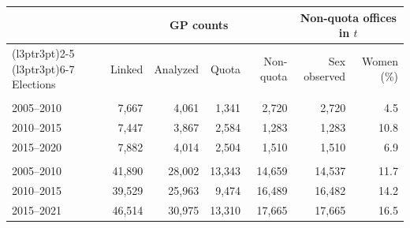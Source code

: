 
\begin{tabular}[t]{lrrrrrr}
\toprule
\multicolumn{1}{c}{ } & \multicolumn{4}{c}{GP counts} & \multicolumn{2}{c}{Non-quota offices in $t$} \\
\cmidrule(l{3pt}r{3pt}){2-5} \cmidrule(l{3pt}r{3pt}){6-7}
Elections & Linked & Analyzed & Quota & Non-quota & Sex observed & Women (\%)\\
\midrule
\addlinespace[0.3em]
\multicolumn{7}{l}{\textit{\textbf{Rajasthan}}}\\
\hspace{1em}2005--2010 & 7,667 & 4,061 & 1,341 & 2,720 & 2,720 & 4.5\\
\hspace{1em}2010--2015 & 7,447 & 3,867 & 2,584 & 1,283 & 1,283 & 10.8\\
\hspace{1em}2015--2020 & 7,882 & 4,014 & 2,504 & 1,510 & 1,510 & 6.9\\
\addlinespace[0.3em]
\multicolumn{7}{l}{\textit{\textbf{Uttar Pradesh}}}\\
\hspace{1em}2005--2010 & 41,890 & 28,002 & 13,343 & 14,659 & 14,537 & 11.7\\
\hspace{1em}2010--2015 & 39,529 & 25,963 & 9,474 & 16,489 & 16,482 & 14.2\\
\hspace{1em}2015--2021 & 46,514 & 30,975 & 13,310 & 17,665 & 17,665 & 16.5\\
\bottomrule
\end{tabular}
